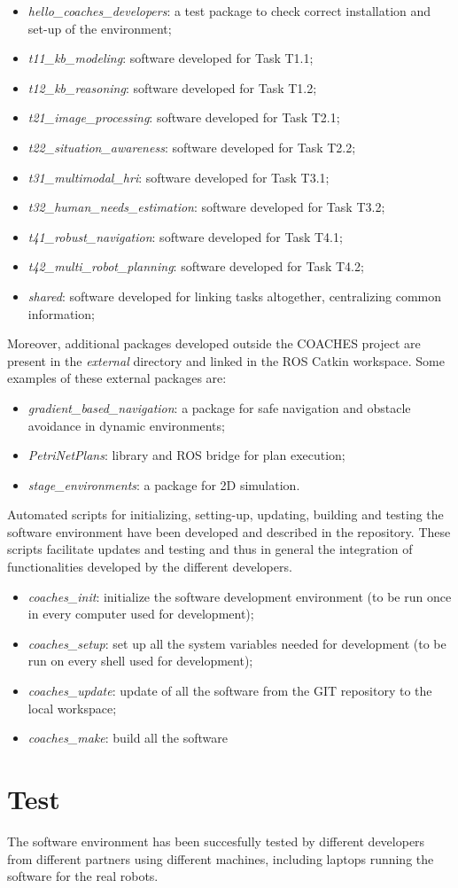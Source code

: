 \documentclass{article}
\begin{document}
\begin{itemize}
\item \emph{hello\_coaches\_developers}: a test package to check correct installation and set-up of the environment;
\item \emph{t11\_kb\_modeling}: software developed for Task T1.1;
\item \emph{t12\_kb\_reasoning}: software developed for Task T1.2;
\item \emph{t21\_image\_processing}: software developed for Task T2.1;
\item \emph{t22\_situation\_awareness}: software developed for Task T2.2;
\item \emph{t31\_multimodal\_hri}: software developed for Task T3.1;
\item \emph{t32\_human\_needs\_estimation}: software developed for Task T3.2;
\item \emph{t41\_robust\_navigation}: software developed for Task T4.1;
\item \emph{t42\_multi\_robot\_planning}: software developed for Task T4.2;
\item \emph{shared}: software developed for linking tasks altogether, centralizing common information;
\end{itemize}


Moreover, additional packages developed outside the COACHES project are present in the \emph{external} directory and linked in the ROS Catkin workspace.
Some examples of these external packages are:
\begin{itemize}
\item \emph{gradient\_based\_navigation}: a package for safe navigation and obstacle avoidance in dynamic environments;
\item \emph{PetriNetPlans}: library and ROS bridge for plan execution;
\item \emph{stage\_environments}: a package for 2D simulation.
\end{itemize}

Automated scripts for initializing, setting-up, updating, building and testing the software environment have been developed and described in the repository. These scripts facilitate updates and testing and thus in  general the integration of functionalities developed by the different developers.

\begin{itemize}
\item \emph{coaches\_init}: initialize the software development environment (to be run once in every computer used for development);
\item \emph{coaches\_setup}:   set up all the system variables needed for development (to be run on every shell used for development);
\item \emph{coaches\_update}:  update of all the software from the GIT repository to the local workspace;
\item \emph{coaches\_make}:   build all the software
\end{itemize}

\section{Test}

The software environment has been succesfully tested by different developers from different partners using different machines, including laptops running the software for the real robots.
\end{document}
